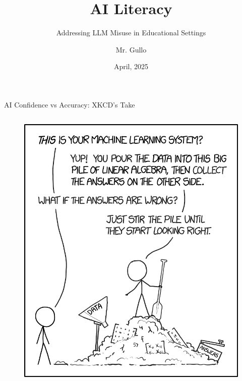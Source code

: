 \documentclass{beamer}
\title[Critical AI Literacy]{AI Literacy}
\subtitle{Addressing LLM Misuse in Educational Settings}
\author[Mr. Gullo]{Mr. Gullo}
\date[April 2025]{April, 2025} %
\begin{document}
\begin{frame}
\titlepage
\end{frame}

\begin{frame}{AI Confidence vs Accuracy: XKCD's Take}
  \begin{columns}
    \begin{column}{0.48\textwidth}
      \begin{figure}
          \centering
          \includegraphics[width=0.8\linewidth]{../src/cs12/images/cs12-ai-machine_learning.png}

\end{figure}
\end{column}
\end{columns}
\end{frame}
\end{document}
